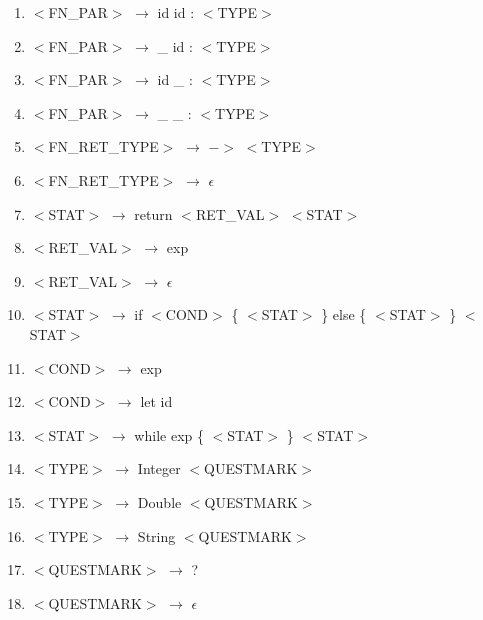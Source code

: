 \documentclass[a4paper,11pt]{article}
\begin{document}
\begin{enumerate}[itemsep=-0.2ex]
    \item $<$FN\_PAR$>$ $\rightarrow$ id id : $<$TYPE$>$
    \item $<$FN\_PAR$>$ $\rightarrow$ \_ id : $<$TYPE$>$
    \item $<$FN\_PAR$>$ $\rightarrow$ id \_ : $<$TYPE$>$
    \item $<$FN\_PAR$>$ $\rightarrow$ \_ \_ : $<$TYPE$>$
    \item $<$FN\_RET\_TYPE$>$ $\rightarrow$ $->$ $<$TYPE$>$
    \item $<$FN\_RET\_TYPE$>$ $\rightarrow$ $\epsilon$
    \item $<$STAT$>$ $\rightarrow$ return $<$RET\_VAL$>$ $<$STAT$>$
    \item $<$RET\_VAL$>$ $\rightarrow$ exp
    \item $<$RET\_VAL$>$ $\rightarrow$ $\epsilon$
    \item $<$STAT$>$ $\rightarrow$ if $<$COND$>$ \{ $<$STAT$>$ \} else \{ $<$STAT$>$ \} $<$STAT$>$
    \item $<$COND$>$ $\rightarrow$ exp
    \item $<$COND$>$ $\rightarrow$ let id
    \item $<$STAT$>$ $\rightarrow$ while exp \{ $<$STAT$>$ \} $<$STAT$>$
    \item $<$TYPE$>$ $\rightarrow$ Integer $<$QUESTMARK$>$
    \item $<$TYPE$>$ $\rightarrow$ Double $<$QUESTMARK$>$
    \item $<$TYPE$>$ $\rightarrow$ String $<$QUESTMARK$>$
    \item $<$QUESTMARK$>$ $\rightarrow$ ?
    \item $<$QUESTMARK$>$ $\rightarrow$ $\epsilon$
\end{enumerate}
\end{document}
